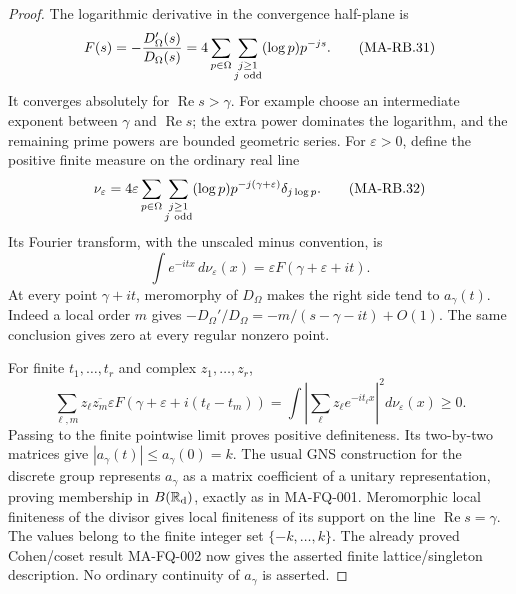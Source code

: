 \begin{proof}
The logarithmic derivative in the convergence half-plane is
\[
 F(s)=-\frac{D_\Omega'(s)}{D_\Omega(s)}
       =4\sum_{p\in\Omega}\sum_{\substack{j\ge1\\j\ {\rm odd}}}
                              (\log p)p^{-js}.
 \tag{MA-RB.31}
\]
It converges absolutely for \(\operatorname{Re}s>\gamma\).
For example choose an intermediate exponent between
\(\gamma\) and \(\operatorname{Re}s\); the extra power
dominates the logarithm, and the remaining prime powers
are bounded geometric series.
For \(\varepsilon>0\), define the positive finite measure
on the ordinary real line
\[
 \nu_\varepsilon
   =4\varepsilon\sum_{p\in\Omega}
          \sum_{\substack{j\ge1\\j\ {\rm odd}}}
              (\log p)p^{-j(\gamma+\varepsilon)}
                                      \delta_{j\log p}.
 \tag{MA-RB.32}
\]
Its Fourier transform, with the unscaled minus convention,
is
\[
 \int e^{-itx}\,d\nu_\varepsilon(x)
                         =\varepsilon F(\gamma+\varepsilon+it).
 \tag{MA-RB.33}
\]
At every point \(\gamma+it\), meromorphy of \(D_\Omega\)
makes the right side tend to \(a_\gamma(t)\).
Indeed a local order \(m\) gives
\(-D_\Omega'/D_\Omega=-m/(s-\gamma-it)+O(1)\).
The same conclusion gives zero at every regular nonzero
point.

For finite \(t_1,\ldots,t_r\) and complex \(z_1,\ldots,z_r\),
\[
 \sum_{\ell,m}z_\ell\overline{z_m}
   \varepsilon F(\gamma+\varepsilon+i(t_\ell-t_m))
    =\int\left|\sum_\ell z_\ell e^{-it_\ell x}\right|^2
                                               d\nu_\varepsilon(x)\ge0 .
 \tag{MA-RB.34}
\]
Passing to the finite pointwise limit proves positive
definiteness.  Its two-by-two matrices give
\(|a_\gamma(t)|\le a_\gamma(0)=k\).
The usual GNS construction for the discrete group
represents \(a_\gamma\) as a matrix coefficient of a
unitary representation, proving membership in
\(B(\mathbb R_{\rm d})\), exactly as in MA-FQ-001.
Meromorphic local finiteness of the divisor gives local
finiteness of its support on the line
\(\operatorname{Re}s=\gamma\).
The values belong to the finite integer set
\(\{-k,\ldots,k\}\).
The already proved Cohen/coset result MA-FQ-002 now
gives the asserted finite lattice/singleton description.
No ordinary continuity of \(a_\gamma\) is asserted.


\end{proof}

